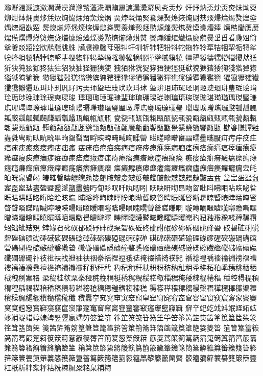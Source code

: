 㶌㶍㶎㶏㶐㶑㶒㶓㶔㶕㶖㶗㶘㶙㶚㶛㶜㶝㶞㶟㶠㶡㶢㶣㶤
㶥㶦㶧㶨㶩㶪㶫㶬㶭㶮㶯㶰㶱㶲㶳㶴㶵㶶㶷㶸㶹㶺㶻㶼㶽
㶾㶿㷀㷁㷂㷃㷄㷅㷆㷇㷈㷉㷊㷋㷌㷍㷎㷏㷐㷑㷒㷓㷔㷕㷖
㷗㷘㷙㷚㷛㷜㷝㷞㷟㷠㷡㷢㷣㷤㷥㷦㷧㷨㷩㷪㷫㷬㷭㷮㷯
㷰㷱㷲㷳㷴㷵㷶㷷㷸㷹㷺㷻㷼㷽㷾㷿㸀㸁㸂㸃㸄㸅㸆㸇㸈
㸉㸊㸋㸌㸍㸎㸏㸐㸑㸒㸓㸔㸕㸖㸗㸘㸙㸚㸛㸜㸝㸞㸟㸠㸡
㸢㸣㸤㸥㸦㸧㸨㸩㸪㸫㸬㸭㸮㸯㸰㸱㸲㸳㸴㸵㸶㸷㸸㸹㸺
㸻㸼㸽㸾㸿㹀㹁㹂㹃㹄㹅㹆㹇㹈㹉㹊㹋㹌㹍㹎㹏㹐㹑㹒㹓
㹔㹕㹖㹗㹘㹙㹚㹛㹜㹝㹞㹟㹠㹡㹢㹣㹤㹥㹦㹧㹨㹩㹪㹫㹬
㹭㹮㹯㹰㹱㹲㹳㹴㹵㹶㹷㹸㹹㹺㹻㹼㹽㹾㹿㺀㺁㺂㺃㺄㺅
㺆㺇㺈㺉㺊㺋㺌㺍㺎㺏㺐㺑㺒㺓㺔㺕㺖㺗㺘㺙㺚㺛㺜㺝㺞
㺟㺠㺡㺢㺣㺤㺥㺦㺧㺨㺩㺪㺫㺬㺭㺮㺯㺰㺱㺲㺳㺴㺵㺶㺷
㺸㺹㺺㺻㺼㺽㺾㺿㻀㻁㻂㻃㻄㻅㻆㻇㻈㻉㻊㻋㻌㻍㻎㻏㻐
㻑㻒㻓㻔㻕㻖㻗㻘㻙㻚㻛㻜㻝㻞㻟㻠㻡㻢㻣㻤㻥㻦㻧㻨㻩
㻪㻫㻬㻭㻮㻯㻰㻱㻲㻳㻴㻵㻶㻷㻸㻹㻺㻻㻼㻽㻾㻿㼀㼁㼂
㼃㼄㼅㼆㼇㼈㼉㼊㼋㼌㼍㼎㼏㼐㼑㼒㼓㼔㼕㼖㼗㼘㼙㼚㼛
㼜㼝㼞㼟㼠㼡㼢㼣㼤㼥㼦㼧㼨㼩㼪㼫㼬㼭㼮㼯㼰㼱㼲㼳㼴
㼵㼶㼷㼸㼹㼺㼻㼼㼽㼾㼿㽀㽁㽂㽃㽄㽅㽆㽇㽈㽉㽊㽋㽌㽍
㽎㽏㽐㽑㽒㽓㽔㽕㽖㽗㽘㽙㽚㽛㽜㽝㽞㽟㽠㽡㽢㽣㽤㽥㽦
㽧㽨㽩㽪㽫㽬㽭㽮㽯㽰㽱㽲㽳㽴㽵㽶㽷㽸㽹㽺㽻㽼㽽㽾㽿
㾀㾁㾂㾃㾄㾅㾆㾇㾈㾉㾊㾋㾌㾍㾎㾏㾐㾑㾒㾓㾔㾕㾖㾗㾘
㾙㾚㾛㾜㾝㾞㾟㾠㾡㾢㾣㾤㾥㾦㾧㾨㾩㾪㾫㾬㾭㾮㾯㾰㾱
㾲㾳㾴㾵㾶㾷㾸㾹㾺㾻㾼㾽㾾㾿㿀㿁㿂㿃㿄㿅㿆㿇㿈㿉㿊
㿋㿌㿍㿎㿏㿐㿑㿒㿓㿔㿕㿖㿗㿘㿙㿚㿛㿜㿝㿞㿟㿠㿡㿢㿣
㿤㿥㿦㿧㿨㿩㿪㿫㿬㿭㿮㿯㿰㿱㿲㿳㿴㿵㿶㿷㿸㿹㿺㿻㿼
㿽㿾㿿䀀䀁䀂䀃䀄䀅䀆䀇䀈䀉䀊䀋䀌䀍䀎䀏䀐䀑䀒䀓䀔䀕
䀖䀗䀘䀙䀚䀛䀜䀝䀞䀟䀠䀡䀢䀣䀤䀥䀦䀧䀨䀩䀪䀫䀬䀭䀮
䀯䀰䀱䀲䀳䀴䀵䀶䀷䀸䀹䀺䀻䀼䀽䀾䀿䁀䁁䁂䁃䁄䁅䁆䁇
䁈䁉䁊䁋䁌䁍䁎䁏䁐䁑䁒䁓䁔䁕䁗䁘䁙䁚䁛䁜䁝䁞䁟䁠䁡
䁢䁣䁤䁥䁦䁧䁨䁩䁪䁫䁬䁭䁮䁯䁰䁱䁲䁳䁴䁵䁶䁷䁸䁹䁺
䁻䁼䁽䁾䁿䂀䂁䂂䂃䂄䂅䂆䂇䂈䂉䂊䂋䂌䂍䂎䂏䂐䂑䂒䂓
䂔䂕䂖䂗䂘䂙䂚䂛䂜䂝䂞䂟䂠䂡䂢䂣䂤䂥䂦䂧䂨䂩䂪䂫䂬
䂭䂮䂯䂰䂱䂲䂳䂴䂵䂶䂷䂸䂹䂺䂻䂼䂽䂾䂿䃀䃁䃂䃃䃄䃅
䃆䃇䃈䃉䃊䃋䃌䃍䃎䃏䃐䃑䃒䃓䃔䃕䃖䃗䃘䃙䃚䃛䃜䃝䃞
䃟䃠䃡䃢䃣䃤䃥䃦䃧䃨䃩䃪䃫䃬䃭䃮䃯䃰䃱䃲䃳䃴䃵䃶䃷
䃸䃹䃺䃻䃼䃽䃾䃿䄀䄁䄂䄃䄄䄅䄆䄇䄈䄉䄊䄋䄌䄍䄎䄏䄐
䄑䄒䄓䄔䄕䄖䄗䄘䄙䄚䄛䄜䄝䄞䄟䄠䄡䄢䄣䄤䄥䄦䄧䄨䄩
䄪䄫䄬䄭䄮䄯䄰䄱䄲䄳䄴䄵䄶䄷䄸䄹䄺䄻䄼䄽䄾䄿䅀䅁䅂
䅃䅄䅅䅆䅇䅈䅉䅊䅋䅌䅍䅎䅏䅐䅑䅒䅓䅔䅕䅖䅗䅘䅙䅚䅛
䅜䅝䅞䅠䅡䅢䅣䅤䅥䅦䅧䅨䅩䅪䅫䅬䅭䅮䅯䅰䅱䅲䅳䅴䅵
䅶䅷䅸䅹䅺䅻䅼䅽䅾䅿䆀䆁䆂䆃䆄䆅䆆䆇䆈䆉䆊䆋䆌䆍䆎
䆏䆐䆑䆒䆓䆔䆕䆖䆗䆘䆙䆚䆛䆜䆝䆞䆟䆠䆡䆢䆣䆤䆥䆦䆧
䆨䆩䆪䆫䆬䆭䆮䆯䆰䆱䆲䆳䆴䆵䆶䆷䆸䆹䆺䆻䆼䆽䆾䆿䇀
䇁䇂䇃䇄䇅䇆䇇䇈䇉䇊䇋䇌䇍䇎䇏䇐䇑䇒䇓䇔䇕䇖䇗䇘䇙
䇚䇛䇜䇝䇞䇟䇠䇡䇢䇣䇤䇥䇦䇧䇨䇩䇪䇫䇬䇭䇮䇯䇰䇱䇲
䇳䇴䇵䇶䇷䇸䇹䇺䇻䇼䇽䇾䇿䈀䈁䈂䈃䈄䈅䈆䈇䈈䈉䈊䈋
䈌䈍䈎䈏䈐䈑䈒䈓䈔䈕䈖䈗䈘䈙䈚䈛䈜䈝䈞䈟䈠䈡䈢䈣䈤
䈥䈦䈧䈨䈩䈪䈫䈬䈭䈮䈯䈰䈱䈲䈳䈴䈵䈶䈷䈸䈹䈺䈻䈼䈽
䈾䈿䉀䉁䉂䉃䉄䉅䉆䉇䉈䉉䉊䉋䉌䉍䉎䉏䉐䉑䉒䉓䉔䉕䉖
䉗䉘䉙䉚䉛䉜䉝䉞䉟䉠䉡䉢䉣䉤䉥䉦䉧䉨䉩䉪䉫䉬䉭䉮䉯
䉰䉱䉲䉳䉴䉵䉶䉷䉸䉹䉺䉻䉼䉽䉾䉿䊀䊁䊂䊃䊄䊅䊆䊇䊈
